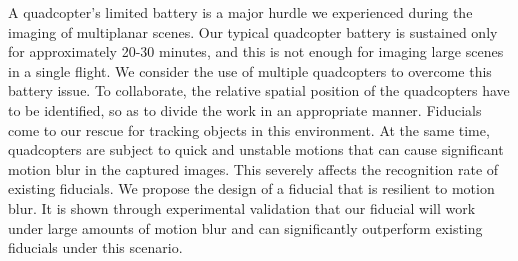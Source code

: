 A quadcopter's limited battery is a major hurdle we experienced during
the imaging of multiplanar scenes. Our typical quadcopter battery is
sustained only for approximately 20-30 minutes, and this is not enough
for imaging large scenes in a single flight. We consider the use of
multiple quadcopters %
to overcome this battery issue. To collaborate, the relative spatial
position of the quadcopters have to be identified, so as to divide the
work in an appropriate manner. Fiducials come to our rescue for
tracking objects in this environment.
At the same time, quadcopters are subject to quick and unstable motions that can cause
significant motion blur in the captured images. This severely affects the
recognition rate of existing fiducials.  We propose the design of a fiducial
that is resilient to motion blur.
It is shown through experimental
validation that our fiducial will work under large amounts of motion blur and
can significantly outperform existing fiducials under this scenario. 


